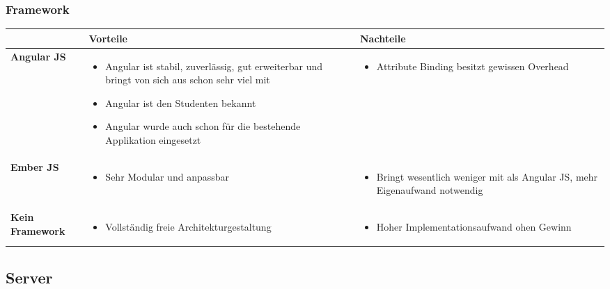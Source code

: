 		\subsubsection{Framework}
			\begin{tabularx}{\textwidth}{|lXX|}
				\hline
					\textbf{} & \textbf{Vorteile} & \textbf{Nachteile}\\
				\hline
					\textbf{Angular JS} &
					\begin{itemize}
						\item Angular ist stabil, zuverlässig, gut erweiterbar und bringt von sich aus schon sehr viel mit
						\item Angular ist den Studenten bekannt
						\item Angular wurde auch schon für die bestehende Applikation eingesetzt
					\end{itemize} &
					\begin{itemize}
						\item Attribute Binding besitzt gewissen Overhead
					\end{itemize} \\
				\hline
					\textbf{Ember JS} &				
					\begin{itemize}
						\item Sehr Modular und anpassbar
					\end{itemize} &
					\begin{itemize}
						\item Bringt wesentlich weniger mit als Angular JS, mehr Eigenaufwand notwendig
					\end{itemize} \\
				\hline
					\textbf{Kein Framework} &
					\begin{itemize}
						\item Vollständig freie Architekturgestaltung
					\end{itemize} &
					\begin{itemize}
						\item Hoher Implementationsaufwand ohen Gewinn
					\end{itemize} \\
				\hline
			\end{tabularx}
			

	\subsection{Server}

